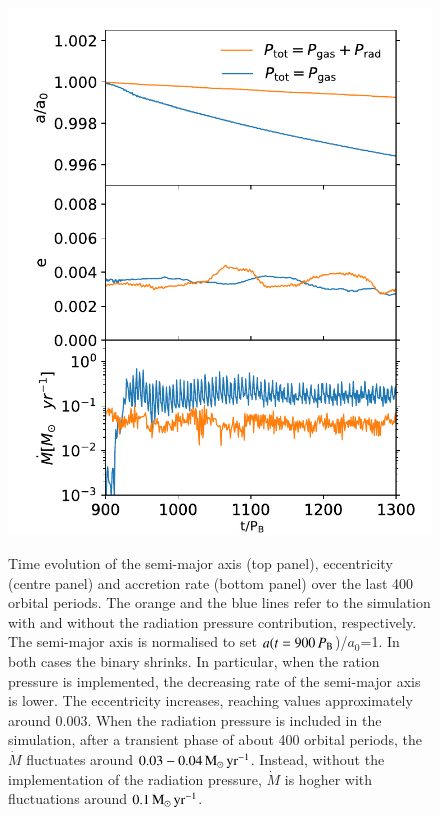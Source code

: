 \documentclass{aa}
\begin{document}
\begin{figure}[h]
    \begin{center}
    \includegraphics[width=\columnwidth]{Fig/Results/e0q1_hr01_md001aemdot.pdf} \\
    \caption{Time evolution of the semi-major axis (top panel), eccentricity (centre panel) and accretion rate (bottom panel) over the last 400 orbital periods. The orange and the blue lines refer to the simulation with and without the radiation pressure contribution, respectively. The semi-major axis is normalised to set $a(t=900  \, P_{\rm B}$)/$a_{0}$=1.
    In both cases the binary shrinks. In particular, when the ration pressure is implemented, the decreasing rate of the semi-major axis is lower. The eccentricity increases, reaching values approximately around 0.003. 
    When the radiation pressure is included in the simulation, after a transient phase of about 400 orbital periods, the $\dot M$ fluctuates around $0.03-0.04 \, \rm M_{\odot} \, yr^{-1}$. Instead, without the implementation of the radiation pressure, $\dot M$ is hogher with fluctuations around $0.1 \, \rm M_{\odot} \, yr^{-1}$.}
    \label{fig:a_e_mdot}
    \end{center}
\end{figure}
\end{document}
